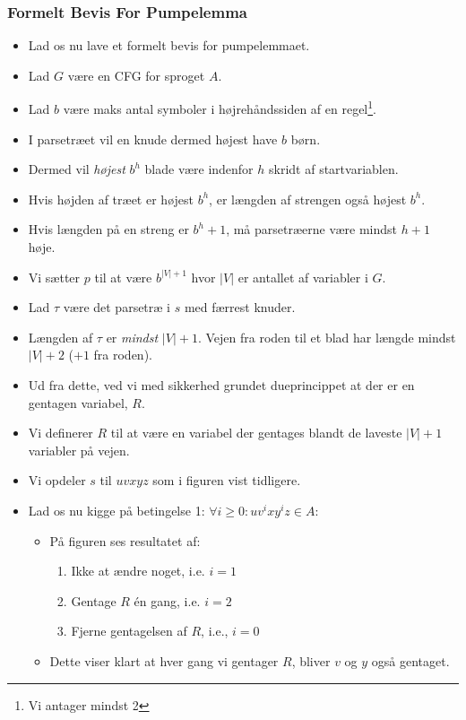 \begin{frame}[allowframebreaks]
	\frametitle{Formelt Bevis For Pumpelemma}
	\begin{itemize}
		\item Lad os nu lave et formelt bevis for pumpelemmaet.
		\item Lad $G$ være en CFG for sproget $A$.
		\item Lad $b$ være maks antal symboler i højrehåndssiden af en regel\footnote{Vi antager mindst 2}.
		\item I parsetræet vil en knude dermed højest have $b$ børn.
		\item Dermed vil \textit{højest} $b^{h}$ blade være indenfor $h$ skridt af startvariablen.
		\item Hvis højden af træet er højest $b^{h}$, er længden af strengen også højest $b^{h}$.
		\item Hvis længden på en streng er $b^{h}+1$, må parsetræerne være mindst $h+1$ høje.
		\item Vi sætter $p$ til at være $b^{|V|+1}$ hvor $|V|$ er antallet af variabler i $G$.
		\item Lad $\tau$ være det parsetræ i $s$ med færrest knuder.
		\item Længden af $\tau$ er \textit{mindst} $|V|+1$. Vejen fra roden til et blad har længde mindst $|V|+2$ ($+1$ fra roden).
		\item Ud fra dette, ved vi med sikkerhed grundet dueprincippet at der er en gentagen variabel, $R$.
		\item Vi definerer $R$ til at være en variabel der gentages blandt de laveste $|V|+1$ variabler på vejen.
		\item Vi opdeler $s$ til $uvxyz$ som i figuren vist tidligere.
		\item Lad os nu kigge på betingelse 1: $\forall i \ge 0 : uv^{i}xy^{i}z \in A$:
		      \begin{itemize}
			      \item På figuren ses resultatet af:
			            \begin{enumerate}
				            \item Ikke at ændre noget, i.e. $i = 1$
				            \item Gentage $R$ én gang, i.e. $i = 2$
				            \item Fjerne gentagelsen af $R$, i.e., $i = 0$
			            \end{enumerate}
			      \item Dette viser klart at hver gang vi gentager $R$, bliver $v$ og $y$ også gentaget.

\end{itemize}
\end{itemize}
\end{frame}
